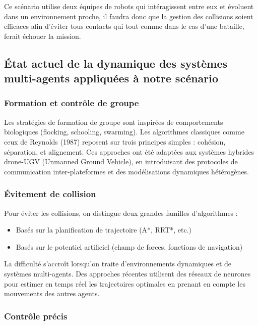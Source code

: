 \documentclass[a4paper,12pt]{article}
\begin{document}
Ce scénario utilise deux équipes de robots qui intéragissent entre eux et évoluent dans un environnement proche, il faudra donc que la gestion des collisions soient efficaces afin d'éviter tous contacts qui tout comme dans le cas d'une bataille, ferait échouer la mission.

\subsection*{État actuel de la dynamique des systèmes multi-agents appliquées à notre scénario} 

\subsubsection*{Formation et contrôle de groupe}

Les stratégies de formation de groupe sont inspirées de comportements biologiques (flocking, schooling, swarming). Les algorithmes classiques comme ceux de Reynolds (1987) reposent sur trois principes simples : cohésion, séparation, et alignement. Ces approches ont été adaptées aux systèmes hybrides drone-UGV (Unmanned Ground Vehicle), en introduisant des protocoles de communication inter-plateformes et des modélisations dynamiques hétérogènes.

\subsubsection*{Évitement de collision}

Pour éviter les collisions, on distingue deux grandes familles d’algorithmes :
\begin{itemize}
    \item Basés sur la planification de trajectoire (A*, RRT*, etc.)
    \item Basés sur le potentiel artificiel (champ de forces, fonctions de navigation)
\end{itemize}

La difficulté s’accroît lorsqu’on traite d’environnements dynamiques et de systèmes multi-agents. Des approches récentes utilisent des réseaux de neurones pour estimer en temps réel les trajectoires optimales en prenant en compte les mouvements des autres agents.

\subsubsection*{Contrôle précis}
\end{document}
